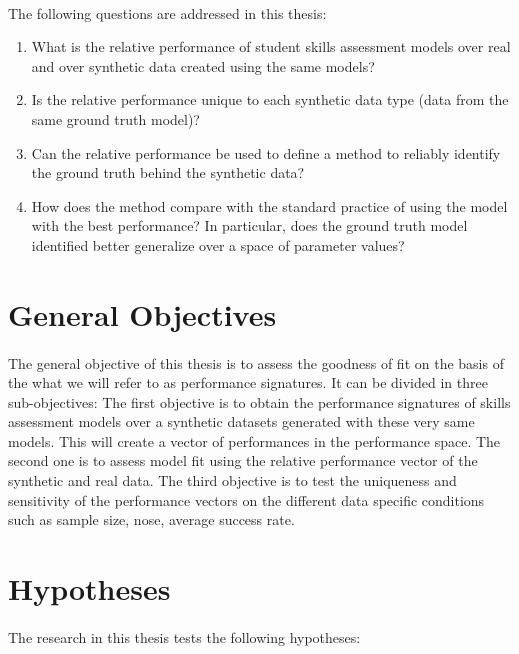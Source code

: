 \paragraph{}The following questions are addressed in this thesis:

\begin{enumerate}
\item What is the relative performance of student skills assessment models over real and over synthetic data created using the same models?
\item Is the relative performance unique to each synthetic data type (data from the same ground truth model)?
\item Can the relative performance be used to define a method to reliably identify the ground truth behind the synthetic data?
\item How does the method compare with the standard practice of using the model with the best performance?  In particular, does the ground truth model identified better generalize over a space of parameter values?
\end{enumerate}


\section{General Objectives}

\paragraph{}The general objective of this thesis is to assess the goodness of fit on the basis of the what we will refer to as performance signatures. It can be divided in three sub-objectives: The first objective is to obtain the performance signatures of skills assessment models over a synthetic datasets generated with these very same models. This will create a vector of performances in the performance space. The second one is to assess model fit using the relative performance vector of the synthetic and real data. The third objective is to test the uniqueness and sensitivity of the performance vectors on the different data specific conditions such as sample size, nose, average success rate.

\section{Hypotheses}
\paragraph{}The research in this thesis tests the following hypotheses:
